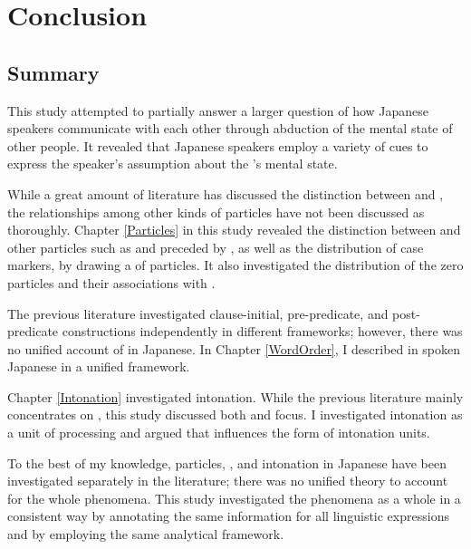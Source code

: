 \chapter{Conclusion}\label{Conclusion}


\section{Summary}

This study attempted to partially answer a larger question of
how Japanese speakers communicate with each other
through abduction of the mental state of other people.
It revealed that Japanese speakers employ a variety of cues to express the speaker's assumption about the 's mental state.

While a great amount of literature has discussed the distinction between  and ,
the relationships among other kinds of particles have not been discussed as thoroughly.
Chapter \ref{Particles} in this study revealed the distinction between  and other  particles such as  and  preceded by ,
as well as the distribution of case markers,
by drawing a  of particles.
It also investigated the distribution of the zero particles and their associations with .

The previous literature investigated clause-initial, pre-predicate, and post-predicate constructions %
independently in different frameworks;
however, there was no unified account of  in Japanese.
In Chapter \ref{WordOrder},
I described  in spoken Japanese in a unified framework.

Chapter \ref{Intonation} investigated intonation.
While the previous literature mainly concentrates on ,
this study discussed both  and focus.
I investigated intonation as a unit of processing and
argued that  influences the form of intonation units.

To the best of my knowledge,
particles, , and intonation in Japanese have been investigated separately in the literature;
there was no unified theory to account for the whole phenomena.
This study investigated the phenomena as a whole in a consistent way
by annotating the same information for all linguistic expressions and
by employing the same analytical framework.



